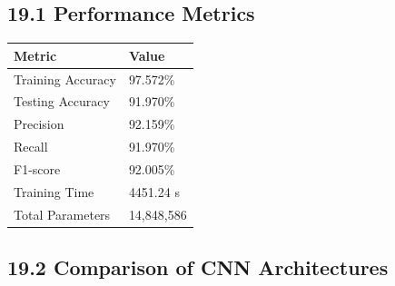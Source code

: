 \documentclass[11pt]{article}
\begin{document}
\subsection*{19.1 Performance Metrics}

\begin{center}

\begin{tabular}{|p{5cm}|p{4cm}|}

\hline

Metric & Value\\

\hline

Training Accuracy & 97.572\%\\

\hline

Testing Accuracy & 91.970\%\\

\hline

Precision & 92.159\%\\

\hline

Recall & 91.970\%\\

\hline

F1-score & 92.005\%\\

\hline

Training Time & 4451.24 s\\

\hline

Total Parameters & 14,848,586\\

\hline

\end{tabular}

\end{center}

\vspace{5mm}

\subsection*{19.2 Comparison of CNN Architectures}
\end{document}
